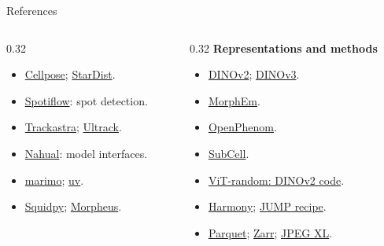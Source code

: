 \documentclass[aspectratio=169,10pt]{beamer}
\begin{document}
\begin{frame}[label={sec:org0000017}]{References}
\begin{columns}[T,onlytextwidth]
\begin{column}{0.32\textwidth}
\begin{itemize}
\item \href{https://github.com/MouseLand/cellpose}{Cellpose}; \href{https://github.com/stardist/stardist}{StarDist}.
\item \href{https://github.com/weigertlab/spotiflow}{Spotiflow}: spot detection.
\item \href{https://github.com/weigertlab/trackastra}{Trackastra}; \href{https://github.com/royerlab/ultrack}{Ultrack}.
\item \href{https://github.com/afermg/nahual}{Nahual}: model interfaces.
\item \href{https://marimo.io/}{marimo}; \href{https://docs.astral.sh/uv/}{uv}.
\item \href{https://squidpy.readthedocs.io/}{Squidpy}; \href{https://github.com/cmap/morpheus.js}{Morpheus}.
\end{itemize}
\end{column}
\begin{column}{0.32\textwidth}
\footnotesize
\textbf{Representations and methods}
\begin{itemize}
\item \href{https://github.com/facebookresearch/dinov2}{DINOv2}; \href{https://github.com/facebookresearch/dinov3}{DINOv3}.
\item \href{https://huggingface.co/CaicedoLab/MorphEm}{MorphEm}.
\item \href{https://huggingface.co/recursionpharma/OpenPhenom}{OpenPhenom}.
\item \href{https://github.com/CellProfiling/subcell-embed}{SubCell}.
\item \href{https://github.com/facebookresearch/dinov2}{ViT-random: DINOv2 code}.
\item \href{https://github.com/immunogenomics/harmony}{Harmony}; \href{https://github.com/broadinstitute/jump-profiling-recipe/tree/a917fa79342ff92cf0ea05d6d9174d9028a90f8f}{JUMP recipe}.
\item \href{https://parquet.apache.org/}{Parquet}; \href{https://zarr.dev/}{Zarr}; \href{https://jpeg.org/jpegxl/}{JPEG XL}.
\end{itemize}
\end{column}
\end{columns}
\end{frame}
\end{document}
